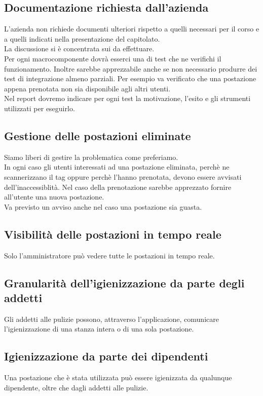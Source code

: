 \subsection*{Documentazione richiesta dall'azienda}
L'azienda non richiede documenti ulteriori rispetto a quelli necessari per il corso e a quelli indicati nella presentazione del capitolato.\\
La discussione si è concentrata sui  da effettuare.\\
Per ogni macrocomponente dovrà esserci una  di test che ne verifichi il funzionamento. Inoltre sarebbe apprezzabile anche se non necessario produrre dei test di integrazione almeno parziali. Per esempio va verificato che una postazione appena prenotata non sia disponibile agli altri utenti.\\
Nel report dovremo indicare per ogni test la motivazione, l'esito e gli strumenti utilizzati per eseguirlo.

\subsection*{Gestione delle postazioni eliminate}
Siamo liberi di gestire la problematica come preferiamo.\\
In ogni caso gli utenti interessati ad una postazione eliminata, perchè ne scannerizzano il tag  oppure perchè l'hanno prenotata, devono essere avvisati dell'inaccessiblità. Nel caso della prenotazione sarebbe apprezzato fornire all'utente una nuova postazione.\\
Va previsto un avviso anche nel caso una postazione sia guasta.

\subsection*{Visibilità delle postazioni in tempo reale}
Solo l'amministratore può vedere tutte le postazioni in tempo reale.

\subsection*{Granularità dell'igienizzazione da parte degli addetti}
Gli addetti alle pulizie possono, attraverso l'applicazione, comunicare l'igienizzazione di una stanza intera o di una sola postazione.

\subsection*{Igienizzazione da parte dei dipendenti}
Una postazione che è stata utilizzata può essere igienizzata da qualunque dipendente, oltre che dagli addetti alle pulizie.

